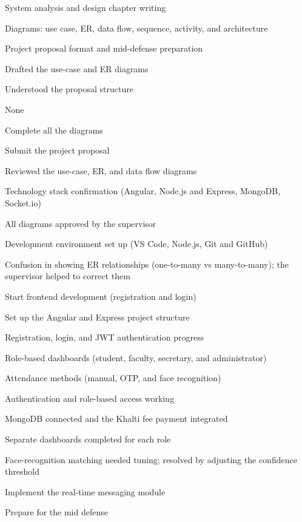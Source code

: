 \documentclass[12pt,a4paper]{report}
\begin{document}
{\item System analysis and design chapter writing
 \item Diagrams: use case, ER, data flow, sequence, activity, and architecture
 \item Project proposal format and mid-defense preparation}
{\item Drafted the use-case and ER diagrams
 \item Understood the proposal structure}
{\item None}
{\item Complete all the diagrams
 \item Submit the project proposal}

{\item Reviewed the use-case, ER, and data flow diagrams
 \item Technology stack confirmation (Angular, Node.js and Express, MongoDB, Socket.io)}
{\item All diagrams approved by the supervisor
 \item Development environment set up (VS Code, Node.js, Git and GitHub)}
{\item Confusion in showing ER relationships (one-to-many vs many-to-many); the supervisor helped to correct them}
{\item Start frontend development (registration and login)
 \item Set up the Angular and Express project structure}

{\item Registration, login, and JWT authentication progress
 \item Role-based dashboards (student, faculty, secretary, and administrator)
 \item Attendance methods (manual, OTP, and face recognition)}
{\item Authentication and role-based access working
 \item MongoDB connected and the Khalti fee payment integrated
 \item Separate dashboards completed for each role}
{\item Face-recognition matching needed tuning; resolved by adjusting the confidence threshold}
{\item Implement the real-time messaging module
 \item Prepare for the mid defense}
\end{document}

